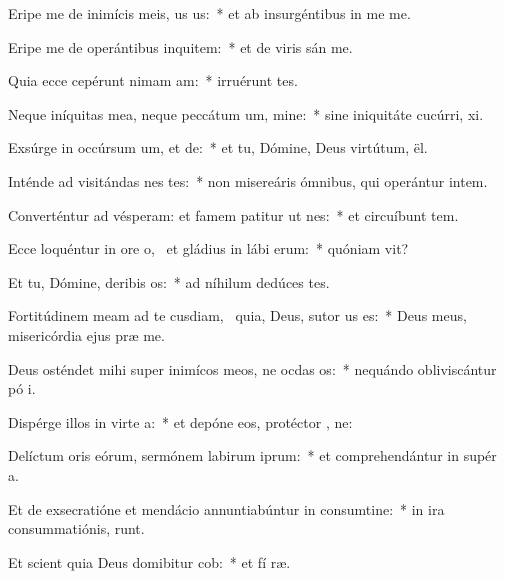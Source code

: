 \item Eripe me de inimícis meis, us us:~* et ab insurgéntibus in me  me.
\item Eripe me de operántibus inquitem:~* et de viris sán  me.
\item Quia ecce cepérunt nimam am:~* irruérunt   tes.
\item Neque iníquitas mea, neque peccátum um, mine:~* sine iniquitáte cucúrri,  xi.
\item Exsúrge in occúrsum um, et de:~* et tu, Dómine, Deus virtútum,  ël.
\item Inténde ad visitándas nes tes:~* non misereáris ómnibus, qui operántur intem.
\item Converténtur ad vésperam: et famem patitur ut nes:~* et circuíbunt tem.
\item Ecce loquéntur in ore o,~\pscross{} et gládius in lábi erum:~* quóniam  vit?
\item Et tu, Dómine, deribis os:~* ad níhilum dedúces  tes.
\item Fortitúdinem meam ad te cusdiam,~\pscross{} quia, Deus, sutor us es:~* Deus meus, misericórdia ejus præ me.
\item Deus osténdet mihi super inimícos meos, ne ocdas os:~* nequándo obliviscántur pó i.
\item Dispérge illos in virte a:~* et depóne eos, protéctor , ne:
\item Delíctum oris eórum, sermónem labirum iprum:~* et comprehendántur in supér a.
\item Et de exsecratióne et mendácio annuntiabúntur in consumtine:~* in ira consummatiónis,   runt.
\item Et scient quia Deus domibitur cob:~* et fí ræ.
